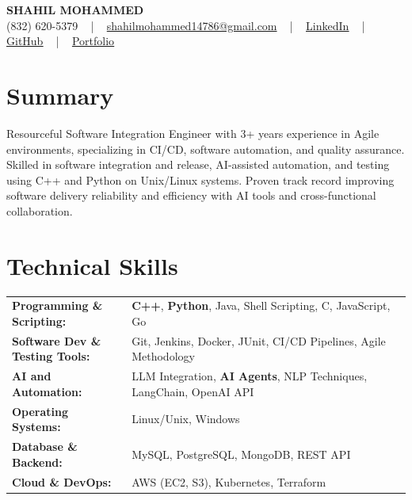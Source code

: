 \documentclass[letterpaper,11pt]{article}
\begin{document}
\begin{center}
    {\fontsize{14pt}{12pt}\selectfont \textbf{\MakeUppercase{Shahil Mohammed}}}\\ \vspace{2pt}
    \fontsize{10pt}{12pt}\selectfont (832) 620-5379 ~ | ~ \href{mailto:shahilmohammed14786@gmail.com}{shahilmohammed14786@gmail.com} ~ | ~  
    \href{https://www.linkedin.com/in/shahil-mohammed-9652931a1/}{\color{blue}\underline{LinkedIn}}  ~ | ~ 
    \href{https://github.com/freakbeast14}{\color{blue}\underline{GitHub}} ~ | ~ 
    \href{https://shahil-mohammed.netlify.app/}{\color{blue}\underline{Portfolio}}
    \vspace{-8pt}
\end{center}

\section{Summary}
\fontsize{9pt}{10pt}\selectfont
Resourceful Software Integration Engineer with 3+ years experience in Agile environments, specializing in CI/CD, software automation, and quality assurance. Skilled in software integration and release, AI-assisted automation, and testing using C++ and Python on Unix/Linux systems. Proven track record improving software delivery reliability and efficiency with AI tools and cross-functional collaboration.
 \vspace{-5pt}
 
\section{Technical Skills}
        \vspace{-14pt}
        \begin{table}[h]
            \fontsize{9pt}{10pt}\selectfont
            \begin{tabular}{p{0.3\linewidth} p{0.7\linewidth}}
                \textbf{Programming \& Scripting:} & \textbf{C++}, \textbf{Python}, Java, Shell Scripting, C, JavaScript, Go \\
                \textbf{Software Dev \& Testing Tools:} & Git, Jenkins, Docker, JUnit, CI/CD Pipelines, Agile Methodology \\
                \textbf{AI and Automation:} & LLM Integration, \textbf{AI Agents}, NLP Techniques, LangChain, OpenAI API \\
                \textbf{Operating Systems:} & Linux/Unix, Windows \\
                \textbf{Database \& Backend:} & MySQL, PostgreSQL, MongoDB, REST API \\
                \textbf{Cloud \& DevOps:} & AWS (EC2, S3), Kubernetes, Terraform \\
            \end{tabular}
        \end{table}
 \vspace{-15pt}
 
\end{document}
